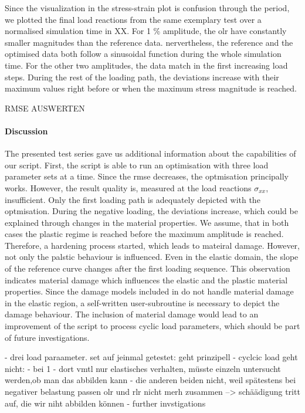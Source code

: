 Since the visualization in the stress-strain plot is confusion through the period, we plotted the final load reactions from the same exemplary test over a normalised simulation time in XX. For 1 \% amplitude, the \acrlong{olr} have constantly smaller magnitudes than the reference data. nervertheless, the reference and the optimised data both follow a sinusoidal function during the whole simulation time.  For the other two amplitudes, the data match in the first increasing load steps. During the rest of the loading path, the deviations increase with their maximum values right before or when the maximum stress magnitude is reached. 


RMSE AUSWERTEN

\paragraph{Discussion}
The presented test series gave us additional information about the capabilities of our script. First, the script is able to run an optimisation with three load parameter sets at a time. Since the \acrshort{rmse} decreases, the optmisation principally works. However, the result quality is, measured at the load reactions $\sigma_{xx}$, insufficient. Only the first loading path is adequately depicted with the optmisation. During the negative loading, the deviations increase, which could be explained through changes in the material properties. We assume, that in both cases the plastic regime is reached before the maximum amplitude is reached. Therefore, a hardening process started, which leads to mateiral damage. However, not only the palstic behaviour is influenced. Even in the elastic domain, the slope of the reference curve changes after the first loading sequence. This observation indicates material damage which influences the elastic and the plastic material properties. Since the damage models included in  do not handle material damage in the elastic region, a self-written user-subroutine is necessary to depict the damage behaviour. The inclusion of material damage would lead to an improvement of the script to process cyclic load parameters, which should be part of future investigations. 


- drei load paraameter. set auf jeinmal getestet: geht prinzipell
- cyclcic load geht nicht:
- bei 1 %
- dort vmtl nur elastisches verhalten, müsste einzeln untersucht werden,ob man das abbilden kann
- die anderen beiden nicht, weil spätestens bei negativer belastung passen olr und rlr nicht merh zusammen --> schäädigung tritt auf, die wir niht abbilden können 
- further invstigations








